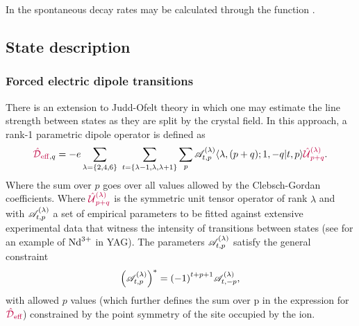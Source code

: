 \documentclass[11pt, twoside,openright]{article}
\begin{document}
In \qlanth the spontaneous decay rates may be calculated through the function .

 

\subsection{State description}

\subsubsection{Forced electric dipole transitions}

There is an extension to Judd-Ofelt theory \cite{may_electric_1987,may_optical_1987,may_circular_1987,reid_anisotropic_1983,reid_lanthanide_1984,burdick_ambiguities_1999,newman_parametrization_1975,reid_recent_1992,reid_superposition_model_1987,reid_electric_1983,moran_measurement_1992,moran_parametric_1990,may_crystals_1989,may_parametric_1989,berry_optical_1988,burdick_energy_level_1994} in which one may estimate the line strength between states as they are split by the crystal field. In this approach, a rank-1 parametric dipole operator is defined as \cite{newman_crystal_2000} 
\begin{equation}
	\textcolor{purple}{{\textcolor{purple}{\hat{\mathcal{D}}}_\text{eff}}}_{,q} = -e \sum_{\lambda=\{2,4,6\}} \,\, \sum_{t=\{\lambda-1,\lambda,\lambda+1\}} \sum_p \mathscr{A}^{(\lambda)}_{t,p} \langle \lambda,(p+q);1,-q|t,p\rangle \textcolor{purple}{\textcolor{purple}{\hat{\mathcal{U}}}^{(\lambda)}_{p+q}} \label{eqn:effective-dipole}.
\end{equation}
Where the sum over $p$ goes over all values allowed by the Clebsch-Gordan coefficients. Where $\textcolor{purple}{\textcolor{purple}{\hat{\mathcal{U}}}^{(\lambda)}_{p+q}}$ is the symmetric unit tensor operator of rank $\lambda$ and with $\mathscr{A}^{(\lambda)}_{t,p}$ a set of empirical parameters to be fitted against extensive experimental data that witness the intensity of transitions between states (see \cite{burdick_energy_level_1994} for an example of $\textrm{Nd}^{3+}$ in YAG). The parameters $\mathscr{A}^{(\lambda)}_{t,p}$ satisfy the general constraint
\begin{equation}
	\left( \mathscr{A}^{(\lambda)}_{t,p} \right)^* = {(-1)}^{t+p+1} \mathscr{A}^{(\lambda)}_{t,-p},
\end{equation}
with allowed $p$ values (which further defines the sum over p in the expression for $\textcolor{purple}{{\textcolor{purple}{\hat{\mathcal{D}}}_\text{eff}}}$) constrained by the point symmetry of the site occupied by the ion.
\end{document}
